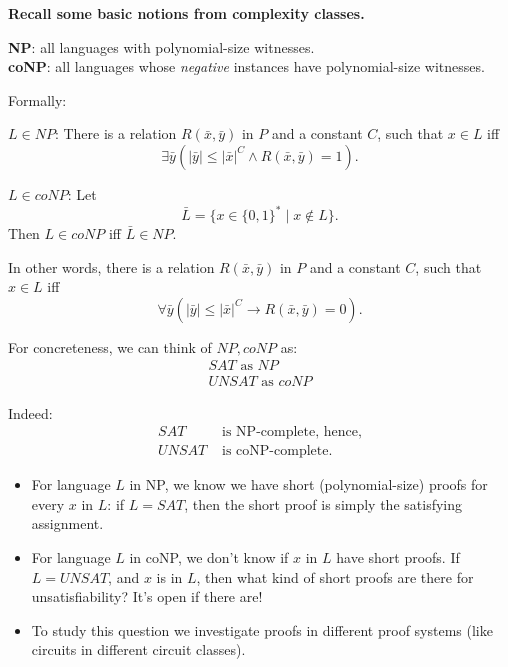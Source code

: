 \begin{tcolorbox}[colframe=white, colback=gray!5, boxrule=0mm, sharp corners]
\textbf{Recall some basic notions from complexity classes.
}

\textbf{NP}: all languages with polynomial-size witnesses. \\
\textbf{coNP}: all languages whose \textit{negative} instances have
polynomial-size witnesses.

Formally:





$L \in NP$: There is a relation $R(\bar{x}, \bar{y})$ in $P$ and a constant $C$, such that $x \in L$ iff 
\[ \exists \bar{y} (|\bar{y}| \leq |\bar{x}|^C \land R(\bar{x}, \bar{y}) = 1). \]

$L \in coNP$: Let 
\[ \bar{L} = \{ x \in \{0,1\}^* \mid x \notin L \}. \]
Then $L \in coNP$ iff $\bar{L} \in NP$.

In other words, there is a relation $R(\bar{x}, \bar{y})$ in $P$ and a constant $C$, such that $x \in L$ iff 
\[ \forall \bar{y} (|\bar{y}| \leq |\bar{x}|^C \to R(\bar{x}, \bar{y}) = 0). \]

For concreteness, we can think of $NP, coNP$ as:
\begin{align*}
    SAT \text{ as }  NP \\
    UNSAT \text{ as } coNP
\end{align*}




Indeed: 
\begin{align*}
    SAT &\text{ is NP-complete, hence,} \\
    UNSAT &\text{ is coNP-complete.}
\end{align*}

\begin{itemize}
    \item For language $L$ in NP, we know we have short (polynomial-size) proofs for every $x$ in $L$: if $L = SAT$, then the short proof is simply the satisfying assignment.
    \item For language $L$ in coNP, we don't know if $x$ in $L$ have short proofs. If $L = UNSAT$, and $x$ is in $L$, then what kind of short proofs are there for unsatisfiability? It's open if there are!
    \item To study this question we investigate proofs in different proof systems (like circuits in different circuit classes).
\end{itemize}

\end{tcolorbox}


